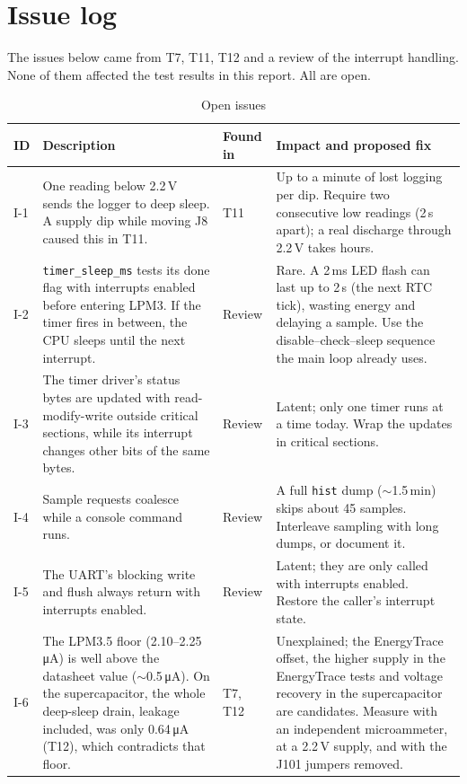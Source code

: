 \documentclass[11pt,a4paper]{article}
\newcommand{\uA}{\,\si{\micro\ampere}}
\newcommand{\code}[1]{\texttt{#1}}
\begin{document}
\section{Issue log}
\label{sec:issues}

The issues below came from T7, T11, T12 and a review of the interrupt handling. None of them affected the test results in this report. All are open.

\begin{table}[H]
\centering\small
\caption{Open issues}
\label{tab:issues}
\begin{tabularx}{\textwidth}{@{}lLlL@{}}
\toprule
ID & Description & Found in & Impact and proposed fix \\
\midrule
I-1 & One reading below 2.2\,V sends the logger to deep sleep. A supply dip while moving J8 caused this in T11. & T11 & Up to a minute of lost logging per dip. Require two consecutive low readings (2\,s apart); a real discharge through 2.2\,V takes hours. \\
I-2 & \code{timer\_sleep\_ms} tests its done flag with interrupts enabled before entering LPM3. If the timer fires in between, the CPU sleeps until the next interrupt. & Review & Rare. A 2\,ms LED flash can last up to 2\,s (the next RTC tick), wasting energy and delaying a sample. Use the disable--check--sleep sequence the main loop already uses. \\
I-3 & The timer driver's status bytes are updated with read-modify-write outside critical sections, while its interrupt changes other bits of the same bytes. & Review & Latent; only one timer runs at a time today. Wrap the updates in critical sections. \\
I-4 & Sample requests coalesce while a console command runs. & Review & A full \code{hist} dump ($\sim$1.5\,min) skips about 45 samples. Interleave sampling with long dumps, or document it. \\
I-5 & The UART's blocking write and flush always return with interrupts enabled. & Review & Latent; they are only called with interrupts enabled. Restore the caller's interrupt state. \\
I-6 & The LPM3.5 floor (2.10--2.25\uA) is well above the datasheet value ($\sim$0.5\uA). On the supercapacitor, the whole deep-sleep drain, leakage included, was only 0.64\uA{} (T12), which contradicts that floor. & T7, T12 & Unexplained; the EnergyTrace offset, the higher supply in the EnergyTrace tests and voltage recovery in the supercapacitor are candidates. Measure with an independent microammeter, at a 2.2\,V supply, and with the J101 jumpers removed. \\
\bottomrule
\end{tabularx}
\end{table}
\end{document}
